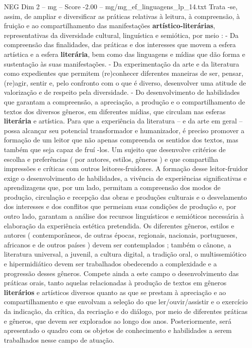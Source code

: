 \begin{textsample}{NEG Dim 2 – mg – Score -2.00 – mg/mg\_ef\_linguagens\_lp\_14.txt}
Trata -se, assim, de ampliar e diversificar as práticas relativas à leitura, à compreensão, à fruição e ao compartilhamento das manifestações \textbf{artístico-literárias}, representativas da diversidade cultural, linguística e semiótica, por meio : - Da compreensão das finalidades, das práticas e dos interesses que movem a esfera artística e a esfera \textbf{literária}, bem como das linguagens e mídias que dão forma e sustentação às suas manifestações. - Da experimentação da arte e da literatura como expedientes que permitem (re)conhecer diferentes maneiras de ser, pensar, (re)agir, sentir e, pelo confronto com o que é diverso, desenvolver uma atitude de valorização e de respeito pela diversidade. - Do desenvolvimento de habilidades que garantam a compreensão, a apreciação, a produção e o compartilhamento de textos dos diversos gêneros, em diferentes mídias, que circulam nas esferas \textbf{literária} e artística.
Para que a experiência da literatura – e da arte em geral – possa alcançar seu potencial transformador e humanizador, é preciso promover a formação de um leitor que não apenas compreenda os sentidos dos textos, mas também que seja capaz de fruí -los.
Um sujeito que desenvolve critérios de escolha e preferências ( por autores, estilos, gêneros ) e que compartilha impressões e críticas com outros leitores-fruidores.
A formação desse leitor-fruidor exige o desenvolvimento de habilidades, a vivência de experiências significativas e aprendizagens que, por um lado, permitam a compreensão dos modos de produção, circulação e recepção das obras e produções culturais e o desvelamento dos interesses e dos conflitos que permeiam suas condições de produção e, por outro lado, garantam a análise dos recursos linguísticos e semióticos necessária à elaboração da experiência estética pretendida.
Os diferentes gêneros, estilos e autores ( contemporâneos, de outras épocas, regionais, nacionais, portugueses, africanos e de outros países ) devem ser contemplados ; também o cânone, a literatura universal, a juvenil, a cultura digital, a tradição oral, o multissemiótico e hipermidiático devem ser trabalhados obedecendo a complexidade e a progressão desses gêneros.
Compete ainda a este campo o desenvolvimento das práticas orais, tanto aquelas relacionadas à produção de textos em gêneros \textbf{literários} e artísticos diversos quanto as que se prestam à apreciação e ao compartilhamento e que envolvam a seleção do que ler/ouvir/assistir e o exercício da indicação, da crítica, da recriação e do diálogo, por meio de diferentes práticas e gêneros, que devem ser explorados ao longo dos anos.
Posteriormente, será apresentado o quadro com os objetos de conhecimento e habilidades a serem trabalhados nesse campo de atuação.

\end{textsample}
